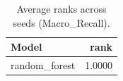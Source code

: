 \begin{table}[t]
\centering
\begin{tabular}{lr}
\toprule
Model & rank \\
\midrule
random_forest & 1.0000 \\
\bottomrule
\end{tabular}
\caption{Average ranks across seeds (Macro_Recall).}
\label{tab:avg_rank_Macro_Recall}
\end{table}